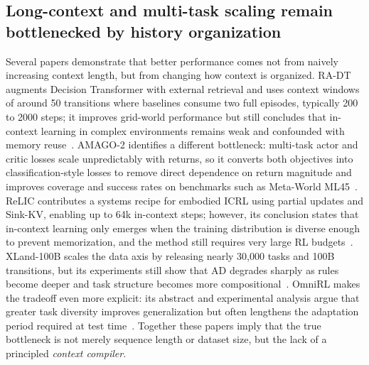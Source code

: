 \documentclass[10pt,twocolumn,letterpaper]{article}
\begin{document}
\subsection{Long-context and multi-task scaling remain bottlenecked by history organization}
Several papers demonstrate that better performance comes not from naively increasing context length, but from changing how context is organized. RA-DT augments Decision Transformer with external retrieval and uses context windows of around 50 transitions where baselines consume two full episodes, typically 200 to 2000 steps; it improves grid-world performance but still concludes that in-context learning in complex environments remains weak and confounded with memory reuse~\cite{schmied2024radt}. AMAGO-2 identifies a different bottleneck: multi-task actor and critic losses scale unpredictably with returns, so it converts both objectives into classification-style losses to remove direct dependence on return magnitude and improves coverage and success rates on benchmarks such as Meta-World ML45~\cite{grigsby2024amago2}. ReLIC contributes a systems recipe for embodied ICRL using partial updates and Sink-KV, enabling up to 64k in-context steps; however, its conclusion states that in-context learning only emerges when the training distribution is diverse enough to prevent memorization, and the method still requires very large RL budgets~\cite{elawady2024relic}. XLand-100B scales the data axis by releasing nearly 30,000 tasks and 100B transitions, but its experiments still show that AD degrades sharply as rules become deeper and task structure becomes more compositional~\cite{nikulin2024xland100b}. OmniRL makes the tradeoff even more explicit: its abstract and experimental analysis argue that greater task diversity improves generalization but often lengthens the adaptation period required at test time~\cite{wang2025omnirl}. Together these papers imply that the true bottleneck is not merely sequence length or dataset size, but the lack of a principled \emph{context compiler}.
\end{document}
